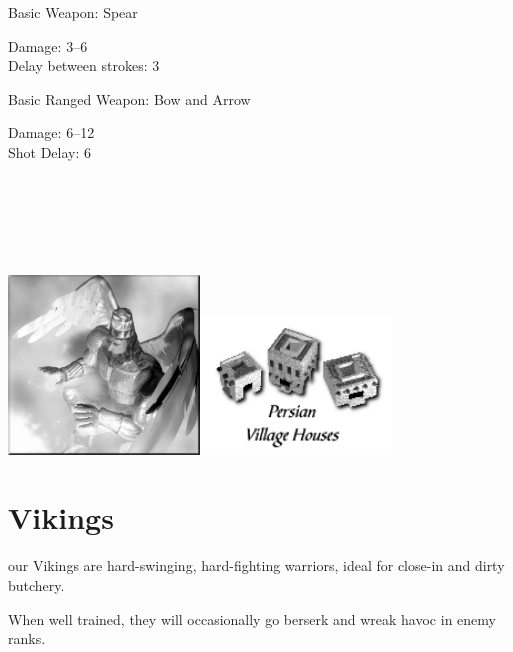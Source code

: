 Basic Weapon: Spear
\begin{changemargin}{.5cm}{0cm}
	Damage: 3–6 \\
	Delay between strokes: 3
\end{changemargin}
Basic Ranged Weapon: Bow and Arrow
\begin{changemargin}{.5cm}{0cm}
	Damage: 6–12 \\
	Shot Delay: 6 \\ \\ \\ \\ \\ \\
\end{changemargin}

\begin{center}
	\includegraphics[width=2in]{Ahealinglord}\hspace{1pt}\includegraphics[width=2in]{Ipersianhouse}
\end{center}

\clearpage

\section{Vikings}


our Vikings are hard-swinging, hard-fighting warriors, ideal for close-in and dirty butchery.

When well trained, they will occasionally go berserk and wreak havoc in enemy ranks.


